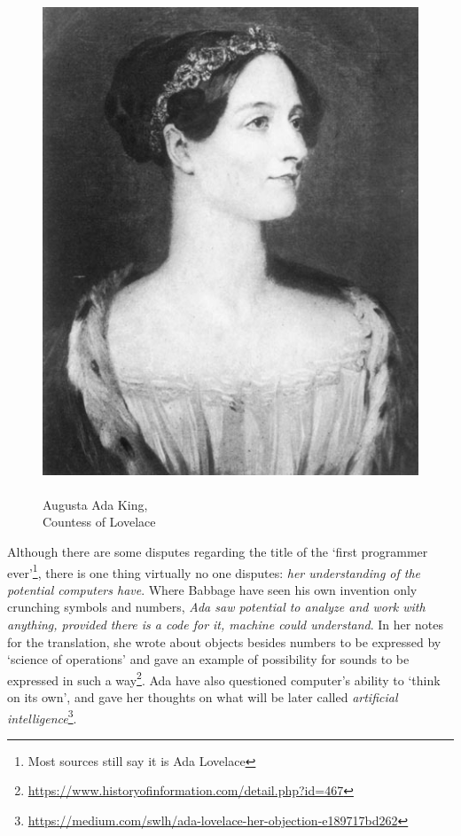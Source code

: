 \documentclass{report}
\begin{document}
            \begin{figure}
                \centering
                \includegraphics[scale=0.2]{images/persons/person_ada_lovelace.jpg}
                \caption{\\Augusta Ada King, \\ Countess of Lovelace}
            \end{figure}

            Although there are some disputes regarding the title of the `first programmer ever'\footnote{Most sources still say it is Ada Lovelace}, there is one thing virtually
            no one disputes: \emph{her understanding of the potential computers have}. Where Babbage have seen his own invention only crunching symbols and numbers, \emph{Ada saw
            potential to analyze and work with anything, provided there is a code for it, machine could understand}. In her notes for the translation, she wrote about objects besides
            numbers to be expressed by `science of operations' and gave an example of possibility for sounds to be expressed in such a way\footnote{\href{https://www.historyofinformation.com/detail.php?id=467}
            {https://www.historyofinformation.com/detail.php?id=467}}. Ada have also questioned computer's ability to `think on its own', and gave her thoughts on what will be later
            called \emph{artificial intelligence}\footnote{\href{https://medium.com/swlh/ada-lovelace-her-objection-e189717bd262}{https://medium.com/swlh/ada-lovelace-her-objection-e189717bd262}}.\par
\end{document}
